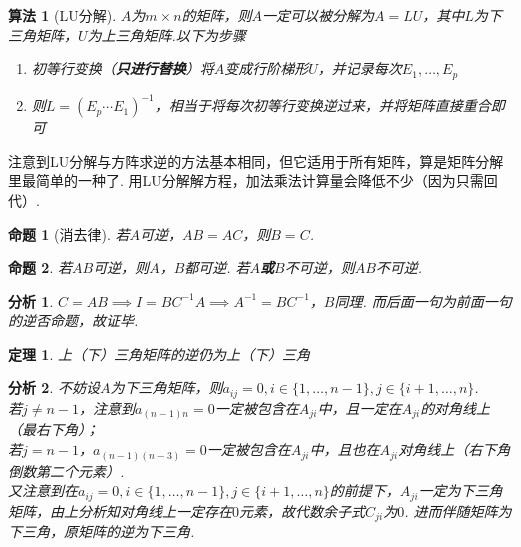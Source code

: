 \documentclass[11pt,UTF8]{ctexart}
\newtheorem{theorem}{定理}
\newtheorem{algorithm}{算法}
\newtheorem{proposition}{命题}
\newtheorem*{analysis}{分析}
\begin{document}
\begin{algorithm}[LU分解]
$A$为$m\times n$的矩阵，则$A$一定可以被分解为$A=LU$，其中$L$为下三角矩阵，$U$为上三角矩阵.以下为步骤
\begin{enumerate}
	\itemsep -3pt
	\item 初等行变换（\textbf{只进行替换}）将$A$变成行阶梯形$U$，并记录每次$E_1,\dots,E_p$
	\item 则$L=(E_p\cdots E_1)^{-1}$，相当于将每次初等行变换逆过来，并将矩阵直接重合即可
\end{enumerate}
\end{algorithm}
\par 注意到LU分解与方阵求逆的方法基本相同，但它适用于所有矩阵，算是矩阵分解里最简单的一种了. 用LU分解解方程，加法乘法计算量会降低不少（因为只需回代）.
\begin{proposition}[消去律]
若$A$可逆，$AB=AC$，则$B=C$.
\end{proposition}
\begin{proposition}
若$AB$可逆，则$A$，$B$都可逆. 若$A$\textbf{或}$B$不可逆，则$AB$不可逆.
\end{proposition}
\begin{analysis}
$C=AB\implies I=BC^{-1}A\implies A^{-1}=BC^{-1}$，$B$同理. 而后面一句为前面一句的逆否命题，故证毕.
\end{analysis}
\begin{theorem}
上（下）三角矩阵的逆仍为上（下）三角
\end{theorem}
\begin{analysis}
不妨设$A$为下三角矩阵，则$a_{ij}=0,i\in\{1,\dots,n-1\},j\in\{i+1,\dots,n\}$.\\
若$j\ne n-1$，注意到$a_{(n-1)n}=0$一定被包含在$A_{ji}$中，且一定在$A_{ji}$的对角线上（最右下角）；\\
若$j=n-1$，$a_{(n-1)(n-3)}=0$一定被包含在$A_{ji}$中，且也在$A_{ji}$对角线上（右下角倒数第二个元素）.\\
又注意到在$a_{ij}=0,i\in\{1,\dots,n-1\},j\in\{i+1,\dots,n\}$的前提下，$A_{ji}$一定为下三角矩阵，由上分析知对角线上一定存在$0$元素，故代数余子式$C_{ji}$为$0$. 进而伴随矩阵为下三角，原矩阵的逆为下三角.
\end{analysis}
\end{document}
